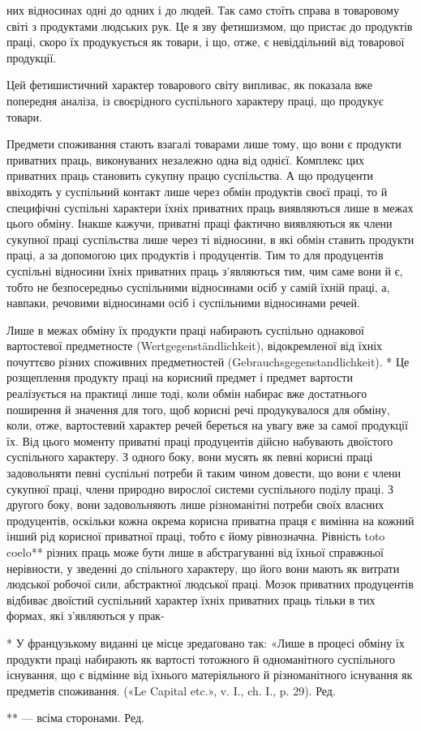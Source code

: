 них відносинах одні до одних і до людей. Так само стоїть справа
в товаровому світі з продуктами людських рук. Це я зву фетишизмом,
що пристає до продуктів праці, скоро їх продукується
як товари, і що, отже, є невіддільний від товарової продукції.

Цей фетишистичний характер товарового світу випливає, як
показала вже попередня аналіза, із своєрідного суспільного
характеру праці, що продукує товари.

Предмети споживання стають взагалі товарами лише тому, що
вони є продукти приватних праць, виконуваних незалежно одна
від однієї. Комплекс цих приватних праць становить сукупну
працю суспільства. А що продуценти ввіходять у суспільний контакт
лише через обмін продуктів своєї праці, то й специфічні суспільні
характери їхніх приватних праць виявляються лише в
межах цього обміну. Інакше кажучи, приватні праці фактично
виявляються як члени сукупної праці суспільства лише через ті
відносини, в які обмін ставить продукти праці, а за допомогою цих
продуктів і продуцентів. Тим то для продуцентів суспільні відносини
їхніх приватних праць з’являються тим, чим саме вони
й є, тобто не безпосередньо суспільними відносинами осіб у самій
їхній праці, а, навпаки, речовими відносинами осіб і суспільними
відносинами речей.

Лише в межах обміну їх продукти праці набирають суспільно
однакової вартостевої предметносте (Wertgegenständlichkeit), відокремленої
від їхніх почуттєво різних споживних предметностей
(Gebrauchsgegenstandlichkeit). * Це розщеплення продукту праці
на корисний предмет і предмет вартости реалізується на практиці
лише тоді, коли обмін набирає вже достатнього поширення й значення
для того, щоб корисні речі продукувалося для обміну, коли,
отже, вартостевий характер речей береться на увагу вже за самої
продукції їх. Від цього моменту приватні праці продуцентів
дійсно набувають двоїстого суспільного характеру. З одного боку,
вони мусять як певні корисні праці задовольняти певні суспільні
потреби й таким чином довести, що вони є члени сукупної праці,
члени природно вирослої системи суспільного поділу праці. З другого
боку, вони задовольняють лише різноманітні потреби своїх
власних продуцентів, оскільки кожна окрема корисна приватна
праця є вимінна на кожний інший рід корисної приватної праці,
тобто є йому рівнозначна. Рівність toto coelo** різних праць може
бути лише в абстрагуванні від їхньої справжньої нерівности, у
зведенні до спільного характеру, що його вони мають як витрати
людської робочої сили, абстрактної людської праці. Мозок приватних
продуцентів відбиває двоїстий суспільний характер їхніх
приватних праць тільки в тих формах, які з’являються у прак-

* У французькому виданні це місце зредаґовано так: «Лише в процесі
обміну їх продукти праці набирають як вартості тотожного й одноманітного
суспільного існування, що є відмінне від їхнього матеріяльного
й різноманітного існування як предметів споживання. («Le Capital
etc.», v. I., ch. I., p. 29). Ред.

** — всіма сторонами. Ред.
